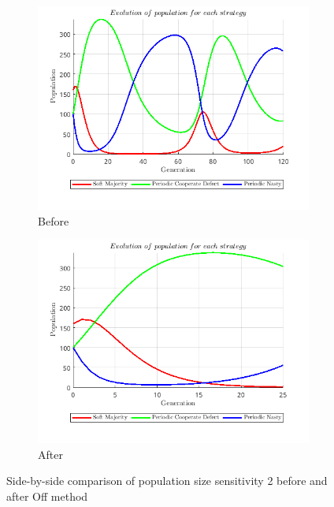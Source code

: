 \documentclass[12pt]{report}
\begin{document}
\begin{figure}[H]
    \centering
    \begin{subfigure}[t]{0.45\textwidth}
        \centering
        \includegraphics[width=\textwidth]{population_size_sensitivity_2_before_off.png}
        \caption{Before}
    \end{subfigure}
    \hfill
    \begin{subfigure}[t]{0.45\textwidth}
        \centering
        \includegraphics[width=\textwidth]{population_size_sensitivity_2_after_off.png}
        \caption{After}
    \end{subfigure}
    \caption{Side-by-side comparison of population size sensitivity 2 before and after Off method}
\end{figure}
\end{document}
